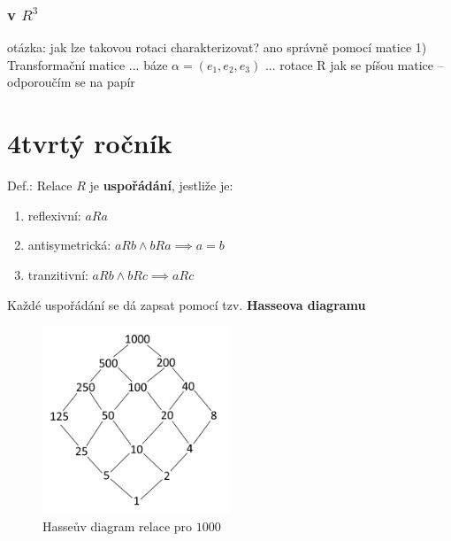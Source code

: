 \documentclass{article}
\begin{document}
\section{v $R^3$}
otázka: jak lze takovou rotaci charakterizovat? ano správně pomocí matice
1) Transformační matice
... báze $\alpha = (e_1, e_2, e_3)$
... rotace R
jak se píšou matice -- odporoučím se na papír

\part{4tvrtý ročník}

Def.: Relace $R$ je \textbf{uspořádání}, jestliže je:
\begin{enumerate}
  \item reflexivní: $aRa$
  \item antisymetrická: $aRb  \land bRa \implies a = b$
  \item tranzitivní: $aRb \land bRc \implies aRc$
\end{enumerate}

Každé uspořádání se dá zapsat pomocí tzv. \textbf{Hasseova diagramu}

\begin{figure}[h]
  \begin{center}
    \includegraphics[width=0.5\textwidth]{hasseuv.png}
    \caption{Hasseův diagram relace  pro $1000$}
  \end{center}
\end{figure}
\end{document}
